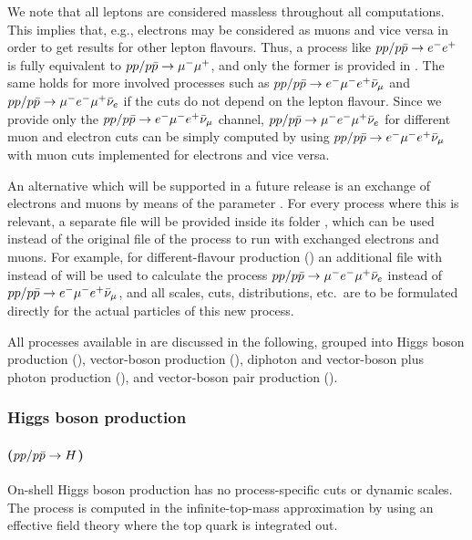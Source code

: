 \documentclass[english,11pt]{article}
\begin{document}
We note that all leptons are considered massless throughout all computations. This implies that, e.g., electrons may be considered as 
muons and vice versa in order to get results for other lepton flavours. Thus, a process like $pp/p\bar{p}\to e^-e^+$ is fully equivalent to $pp/p\bar{p}\to \mu^-\mu^+$, and only the former is provided in \Matrix{}. 
The same holds for more involved processes such as $pp/p\bar{p}\to e^- \mu^- e^+ \bar\nu_\mu$ and $pp/p\bar{p}\to \mu^- e^- \mu^+ \bar\nu_e$ if the 
cuts do not depend on the lepton flavour. Since we provide only the $pp/p\bar{p}\to e^- \mu^- e^+ \bar\nu_\mu$ channel, 
$pp/p\bar{p}\to \mu^- e^- \mu^+ \bar\nu_e$ for 
different muon and electron cuts can be simply computed by using $pp/p\bar{p}\to e^- \mu^- e^+ \bar\nu_\mu$ with muon cuts implemented 
for electrons and vice versa.

An alternative which will be supported in a future release is an exchange of electrons and muons 
by means of the parameter . For every process where this is relevant, a 
separate file  will be provided inside its folder , which can 
be used instead of the original file  of the process to run with exchanged 
electrons and muons. For example, for different-flavour \wz{} production () an additional file with 
 instead of   will be used to calculate the 
process $pp/p\bar{p}\to \mu^- e^- \mu^+ \bar\nu_e$ instead of $pp/p\bar{p}\to e^- \mu^- e^+ \bar\nu_\mu$, and all scales, cuts, distributions, 
etc.\ are to be formulated directly for the actual particles of this new process.

All processes available in \Matrix{} are discussed in the following, grouped into Higgs boson production (), vector-boson production (), diphoton and vector-boson plus photon production (), and vector-boson pair production ().




\subsubsection{Higgs boson production}\label{sec:Higgsbosonprocesses}
\paragraph{ ($pp/p\bar{p}\to H$)}
On-shell Higgs boson production has no process-specific cuts or dynamic scales. The process is computed in the 
infinite-top-mass approximation by using an effective field theory where the top quark is integrated out.
\end{document}

